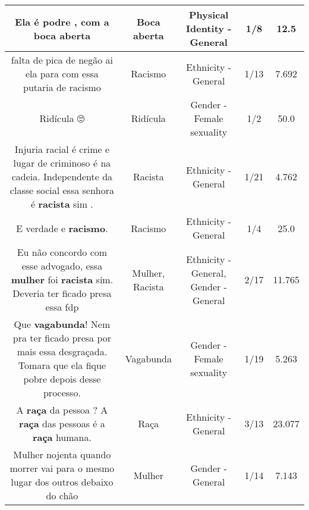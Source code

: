 \documentclass[11pt]{article}
\newlength\mylength
\begin{document}
\begin{center}
\begin{longtable}{|C{.65\mylength}|C{.30\mylength}|C{.12\mylength}|C{.12\mylength}|C{.12\mylength}|}
  \small Ela é podre , com a boca aberta\normalsize   & Boca aberta & Physical Identity - General & 1/8 & 12.5 \\  \hline
  \small falta de pica de negão ai ela para com essa putaria de racismo\normalsize   & Racismo & Ethnicity - General & 1/13 & 7.692 \\  \hline
  \small Ridícula 🙄\normalsize   & Ridícula & Gender - Female sexuality & 1/2 & 50.0 \\  \hline
  \small Injuria racial é crime e lugar de criminoso é na cadeia. Independente da classe social essa senhora é \textbf{racista} sim .\normalsize   & Racista & Ethnicity - General & 1/21 & 4.762 \\  \hline
  \small E verdade e \textbf{racismo}.\normalsize   & Racismo & Ethnicity - General & 1/4 & 25.0 \\  \hline
  \small Eu não concordo com esse advogado, essa \textbf{mulher} foi \textbf{racista} sim. Deveria ter ficado presa essa fdp\normalsize   & Mulher, Racista & Ethnicity - General, Gender - General & 2/17 & 11.765 \\  \hline
  \small Que \textbf{vagabunda}! Nem pra ter ficado presa por mais essa desgraçada. Tomara que ela fique pobre depois desse processo.\normalsize   & Vagabunda & Gender - Female sexuality & 1/19 & 5.263 \\  \hline
  \small A \textbf{raça} da pessoa ? A \textbf{raça} das pessoas é a \textbf{raça} humana.\normalsize   & Raça & Ethnicity - General & 3/13 & 23.077 \\  \hline
  \small Mulher nojenta quando morrer vai para o mesmo lugar dos outros debaixo do chão\normalsize   & Mulher & Gender - General & 1/14 & 7.143 \\  \hline

\end{longtable}
\end{center}
\end{document}
